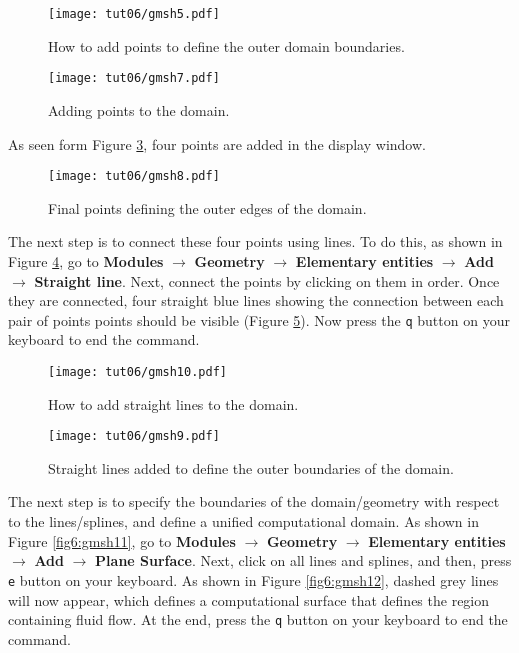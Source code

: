 \begin{figure}[htbp]
    \centering
    \texttt{[image: tut06/gmsh5.pdf]}
    \caption{How to add points to define the outer domain boundaries.}
    \label{fig6:gmsh5}
\end{figure}
\begin{figure}[htbp]
    \centering
    \texttt{[image: tut06/gmsh7.pdf]}
    \caption{Adding points to the domain.}
    \label{fig6:gmsh7}
\end{figure}
As seen form Figure \ref{fig6:gmsh8}, four points are added in the display window.
\begin{figure}[htbp]
    \centering
    \texttt{[image: tut06/gmsh8.pdf]}
    \caption{Final points defining the outer edges of the domain.}
    \label{fig6:gmsh8}
\end{figure}
The next step is to connect these four points using lines. To do this, as shown in Figure \ref{fig6:gmsh10}, go to \textbf{Modules} $\rightarrow$ \textbf{Geometry} $\rightarrow$ \textbf{Elementary entities} $\rightarrow$ \textbf{Add} $\rightarrow$ \textbf{Straight line}. Next, connect the points by clicking on them in order. Once they are connected, four straight blue lines showing the connection between each pair of points points should be visible (Figure \ref{fig6:gmsh9}). Now press the \texttt{q} button on your keyboard to end the command.
\begin{figure}[htbp]
    \centering
    \texttt{[image: tut06/gmsh10.pdf]}
    \caption{How to add straight lines to the domain.}
    \label{fig6:gmsh10}
\end{figure}
\begin{figure}[htbp]
    \centering
    \texttt{[image: tut06/gmsh9.pdf]}
    \caption{Straight lines added to define the outer boundaries of the domain.}
    \label{fig6:gmsh9}
\end{figure}
The next step is to specify the boundaries of the domain/geometry with respect to the lines/splines, and define a unified computational domain. As shown in Figure  \ref{fig6:gmsh11}, go to \textbf{Modules} $\rightarrow$ \textbf{Geometry} $\rightarrow$ \textbf{Elementary entities} $\rightarrow$ \textbf{Add} $\rightarrow$ \textbf{Plane Surface}. Next, click on all lines and splines, and then, press \texttt{e} button on your keyboard. As shown in Figure \ref{fig6:gmsh12}, dashed grey lines will now appear, which defines a computational surface that defines the region containing fluid flow. At the end, press the \texttt{q} button on your keyboard to end the command.
